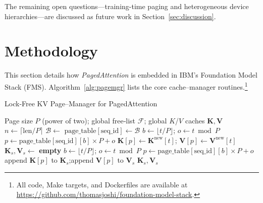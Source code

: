 \documentclass[conference]{IEEEtran}
\begin{document}
The remaining open questions—training-time paging and heterogeneous device hierarchies—are discussed as future work in Section~\ref{sec:discussion}.

\section{Methodology}\label{sec:method}

This section details how \emph{PagedAttention} is embedded in IBM's Foundation Model Stack (FMS).  
Algorithm~\ref{alg:pagemgr} lists the core cache–manager routines.\footnote{All code, Make targets, and Dockerfiles are available at \url{https://github.com/thomasjoshi/foundation-model-stack}.}

\begin{algorithm}[t]
\caption{Lock‑Free KV Page–Manager for PagedAttention}
\label{alg:pagemgr}
\begin{algorithmic}[1]
\Require Page size $P$ (power of two); global free‑list $\mathcal{F}$; global $K$/$V$ caches $\mathbf{K},\mathbf{V}$
    \State $n \gets \lceil \text{len} / P \rceil$  
    \State $\mathcal{B} \gets$          
    \State $\text{page\_table}[\text{seq\_id}] \gets \mathcal{B}$    
\EndProcedure
{}
        \State $b \gets \lfloor t / P \rfloor$; $o \gets t \bmod P$
        \State $p \gets \text{page\_table}[\text{seq\_id}][b] \times P + o$
        \State $\mathbf{K}[p] \gets \mathbf{K}^{\text{new}}[t]$;\quad
               $\mathbf{V}[p] \gets \mathbf{V}^{\text{new}}[t]$
    \EndFor
\EndProcedure
{}
    \State $\mathbf{K}_{\!s},\mathbf{V}_{\!s} \gets$ \textbf{empty}
        \State $b \gets \lfloor t / P \rfloor$; $o \gets t \bmod P$
        \State $p \gets \text{page\_table}[\text{seq\_id}][b] \times P + o$
        \State append $\mathbf{K}[p]$ to $\mathbf{K}_{\!s}$;\quad append $\mathbf{V}[p]$ to $\mathbf{V}_{\!s}$
    \EndFor
    \State \Return $\mathbf{K}_{\!s}, \mathbf{V}_{\!s}$
\EndProcedure
\end{algorithmic}
\end{algorithm}

\vspace{-0.4em}
\end{document}
